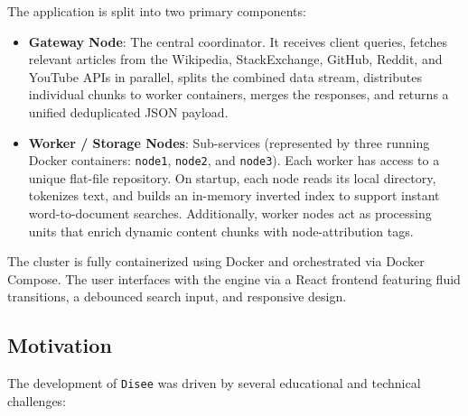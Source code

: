 \documentclass[11pt,a4paper]{article}
\begin{document}
The application is split into two primary components:
\begin{itemize}
    \item \textbf{Gateway Node}: The central coordinator. It receives client queries, fetches relevant articles from the Wikipedia, StackExchange, GitHub, Reddit, and YouTube APIs in parallel, splits the combined data stream, distributes individual chunks to worker containers, merges the responses, and returns a unified deduplicated JSON payload.
    \item \textbf{Worker / Storage Nodes}: Sub-services (represented by three running Docker containers: \texttt{node1}, \texttt{node2}, and \texttt{node3}). Each worker has access to a unique flat-file repository. On startup, each node reads its local directory, tokenizes text, and builds an in-memory inverted index to support instant word-to-document searches. Additionally, worker nodes act as processing units that enrich dynamic content chunks with node-attribution tags.
\end{itemize}

The cluster is fully containerized using Docker and orchestrated via Docker Compose. The user interfaces with the engine via a React frontend featuring fluid transitions, a debounced search input, and responsive design.

\subsection{Motivation}
The development of \texttt{Disee} was driven by several educational and technical challenges:
\end{document}

